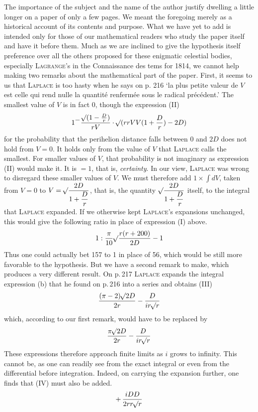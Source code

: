 The importance of the subject and the name of the author justify dwelling a little longer on a paper of only a few pages. We meant the foregoing merely as a historical account of its contents and purpose. What we have yet to add is intended only for those of our mathematical readers who study the paper itself and have it before them. Much as we are inclined to give the hypothesis itself preference over all the others proposed for these enigmatic celestial bodies, especially \textsc{Lagrange}'s in the Connaissance des tems for 1814, we cannot help making two remarks about the mathematical part of the paper. First, it seems to us that \textsc{Laplace} is too hasty when he says on p. 216 `la plus petite valeur de $V$ est celle qui rend nulle la quantité renfermée sous le radical précédent.' The smallest value of $V$ is in fact 0, though the expression (II)
\[1{}^{\displaystyle -}\frac{\mathord{{}^{}\!\surd}(1-\frac{D}{r})}{rV}\cdot\mathord{{}^{}\!\surd}(rrVV(1+\frac{D}{r})-2D)\]
for the probability that the perihelion distance falls between 0 and $2D$ does not hold from $V=0$. It holds only from the value of $V$ that \textsc{Laplace} calls the smallest. For smaller values of $V$, that probability is not imaginary as expression (II) would make it. It is $= 1$, that is, \emph{certainty}. In our view, \textsc{Laplace} was wrong to disregard these smaller values of $V$. We must therefore add $1\times\int dV$, taken from $V = 0$ to $V = \mathord{{}^{}\!\surd}\dfrac{2D}{1+\dfrac{D}{r}}$, that is, the quantity $\mathord{{}^{}\!\surd}\dfrac{2D}{1+\dfrac{D}{r}}$ itself, to the integral that \textsc{Laplace} expanded. If we otherwise kept \textsc{Laplace}'s expansions unchanged, this would give the following ratio in place of expression (I) above.
\[1 : \frac{\pi}{10}\mathord{{}^{}\!\surd}\frac{r(r+200)}{2D} - 1\]
Thus one could actually bet 157 to 1 in place of 56, which would be still more favorable to the hypothesis. But we have a second remark to make, which produces a very different result. On p.\,217 \textsc{Laplace} expands the integral expression (b) that he found on p.\,216 into a series and obtains (III)
\[\frac{(\pi-2)\mathord{{}^{}\!\surd}2D}{2r} - \frac{D}{ir\mathord{{}^{}\!\surd}r}\]
which, according to our first remark, would have to be replaced by
\[
\frac{\pi\mathord{{}^{}\!\surd}2D}{2r} - \frac{D}{ir\mathord{{}^{}\!\surd}r}
\]
These expressions therefore approach finite limits as $i$ grows to infinity. This cannot be, as one can readily see from the exact integral or even from the differential before integration. Indeed, on carrying the expansion further, one finds that (IV) must also be added.
\[+\,\frac{iDD}{2rr\mathord{{}^{}\!\surd}r}\]
